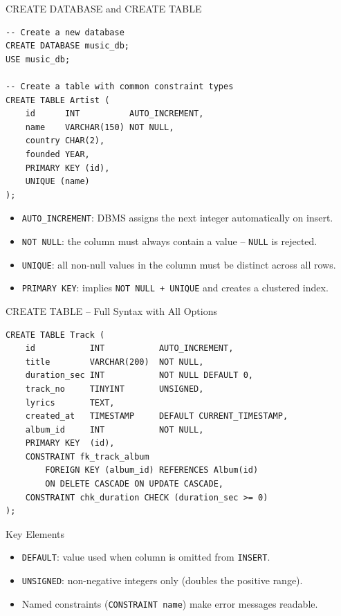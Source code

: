 \begin{frame}[fragile]{CREATE DATABASE and CREATE TABLE}
  \begin{lstlisting}[style=sqlstyle]
-- Create a new database
CREATE DATABASE music_db;
USE music_db;

-- Create a table with common constraint types
CREATE TABLE Artist (
    id      INT          AUTO_INCREMENT,
    name    VARCHAR(150) NOT NULL,
    country CHAR(2),
    founded YEAR,
    PRIMARY KEY (id),
    UNIQUE (name)
);
  \end{lstlisting}

  \begin{itemize}
    \item \texttt{AUTO\_INCREMENT}: DBMS assigns the next integer automatically on insert.
    \item \texttt{NOT NULL}: the column must always contain a value -- \texttt{NULL} is rejected.
    \item \texttt{UNIQUE}: all non-null values in the column must be distinct across all rows.
    \item \texttt{PRIMARY KEY}: implies \texttt{NOT NULL + UNIQUE} and creates a clustered index.
  \end{itemize}
\end{frame}

\begin{frame}[fragile]{CREATE TABLE -- Full Syntax with All Options}
  \begin{lstlisting}[style=sqlstyle]
CREATE TABLE Track (
    id           INT           AUTO_INCREMENT,
    title        VARCHAR(200)  NOT NULL,
    duration_sec INT           NOT NULL DEFAULT 0,
    track_no     TINYINT       UNSIGNED,
    lyrics       TEXT,
    created_at   TIMESTAMP     DEFAULT CURRENT_TIMESTAMP,
    album_id     INT           NOT NULL,
    PRIMARY KEY  (id),
    CONSTRAINT fk_track_album
        FOREIGN KEY (album_id) REFERENCES Album(id)
        ON DELETE CASCADE ON UPDATE CASCADE,
    CONSTRAINT chk_duration CHECK (duration_sec >= 0)
);
  \end{lstlisting}

  \begin{block}{Key Elements}
    \begin{itemize}
      \item \texttt{DEFAULT}: value used when column is omitted from \texttt{INSERT}.
      \item \texttt{UNSIGNED}: non-negative integers only (doubles the positive range).
      \item Named constraints (\texttt{CONSTRAINT name}) make error messages readable.
    \end{itemize}
  \end{block}
\end{frame}

